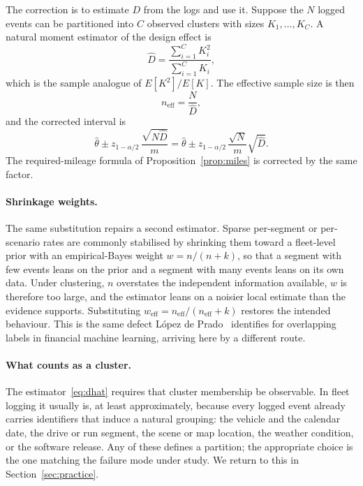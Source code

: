 \documentclass[11pt]{article}
\begin{document}
The correction is to estimate $D$ from the logs and use it. Suppose the $N$ logged
events can be partitioned into $C$ observed clusters with sizes
$K_1, \dots, K_C$. A natural moment estimator of the design effect is
\begin{equation}
\hat{D} = \frac{\sum_{i=1}^{C} K_i^{2}}{\sum_{i=1}^{C} K_i},
\label{eq:dhat}
\end{equation}
which is the sample analogue of $E[K^2]/E[K]$. The effective sample size is then
\begin{equation}
n_{\text{eff}} = \frac{N}{\hat{D}},
\end{equation}
and the corrected interval is
\begin{equation}
\hat{\theta} \pm z_{1-\alpha/2}\,\frac{\sqrt{N \hat{D}}}{m}
= \hat{\theta} \pm z_{1-\alpha/2}\,\frac{\sqrt{N}}{m}\sqrt{\hat{D}} .
\end{equation}
The required-mileage formula of Proposition~\ref{prop:miles} is corrected by the
same factor.

\paragraph{Shrinkage weights.} The same substitution repairs a second estimator.
Sparse per-segment or per-scenario rates are commonly stabilised by shrinking them
toward a fleet-level prior with an empirical-Bayes weight $w = n/(n+k)$, so that a
segment with few events leans on the prior and a segment with many events leans on
its own data. Under clustering, $n$ overstates the independent information
available, $w$ is therefore too large, and the estimator leans on a noisier local
estimate than the evidence supports. Substituting
$w_{\text{eff}} = n_{\text{eff}}/(n_{\text{eff}} + k)$ restores the intended
behaviour. This is the same defect López de Prado~\cite{lopezdeprado2018advances}
identifies for overlapping labels in financial machine learning, arriving here by a
different route.

\paragraph{What counts as a cluster.} The estimator~\eqref{eq:dhat} requires that
cluster membership be observable. In fleet logging it usually is, at least
approximately, because every logged event already carries identifiers that induce a
natural grouping: the vehicle and the calendar date, the drive or run segment, the
scene or map location, the weather condition, or the software release. Any of these
defines a partition; the appropriate choice is the one matching the failure mode
under study. We return to this in Section~\ref{sec:practice}.
\end{document}
